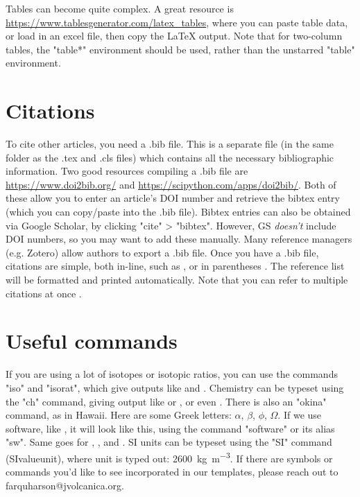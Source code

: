 \documentclass[draft, {\secondLanguage}, english]{volcanica-template}
\begin{document}
Tables can become quite complex. A great resource is \url{https://www.tablesgenerator.com/latex_tables}, where you can paste table data, or load in an excel file, then copy the LaTeX output. Note that for two-column tables, the "table*" environment should be used, rather than the unstarred "table" environment.

\section{Citations}
To cite other articles, you need a .bib file. This is a separate file (in the same folder as the .tex and .cls files) which contains all the necessary bibliographic information. Two good resources compiling a .bib file are \url{https://www.doi2bib.org/} and \url{https://scipython.com/apps/doi2bib/}. Both of these allow you to enter an article's DOI number and retrieve the bibtex entry (which you can copy/paste into the .bib file). Bibtex entries can also be obtained via Google Scholar, by clicking "cite" > "bibtex". However, GS \emph{doesn't} include DOI numbers, so you may want to add these manually. Many reference managers (e.g. Zotero) allow authors to export a .bib file. Once you have a .bib file, citations are simple, both in-line, such as \textcite{Farquharson2018}, or in parentheses \parencite{Kavanagh2022}. The reference list will be formatted and printed automatically. Note that you can refer to multiple citations at once \parencite[e.g.][among others]{Kavanagh2022, Siebert2015}.

\section{Useful commands}

If you are using a lot of isotopes or isotopic ratios, you can use the commands "iso" and "isorat", which give outputs like  and . Chemistry can be typeset using the "ch" command, giving output like  or \ch{[AgCl2]-}, or even . There is also an "okina" command, as in Hawai{\okina}i. Here are some Greek letters: $\alpha$, $\beta$, $\phi$, $\Omega$. If we use software, like , it will look like this, using the command "software" or its alias "sw". Same goes for , , and . SI units can be typeset using the "SI" command (SI{value}{unit}), where  unit is typed out: \SI{2600}{\kilo\gram\per\meter\cubed}. If there are symbols or commands you'd like to see incorporated in our templates, please reach out to farquharson@jvolcanica.org.
\end{document}

